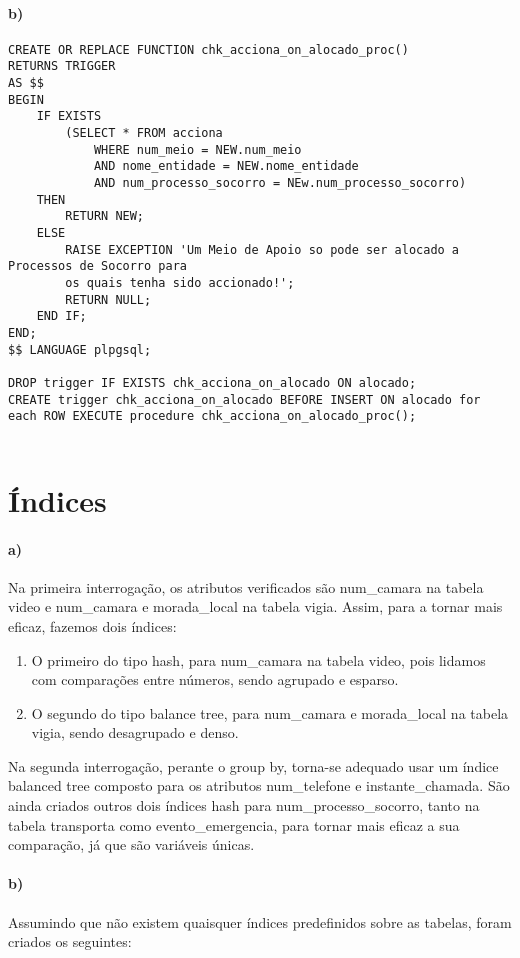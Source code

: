 \documentclass[10pt,a4paper]{article}
\begin{document}
\paragraph{b)}
\begin{verbatim}
CREATE OR REPLACE FUNCTION chk_acciona_on_alocado_proc()
RETURNS TRIGGER
AS $$
BEGIN
    IF EXISTS
        (SELECT * FROM acciona
            WHERE num_meio = NEW.num_meio
            AND nome_entidade = NEW.nome_entidade
            AND num_processo_socorro = NEw.num_processo_socorro)
    THEN
        RETURN NEW;
    ELSE
        RAISE EXCEPTION 'Um Meio de Apoio so pode ser alocado a Processos de Socorro para
        os quais tenha sido accionado!';
        RETURN NULL;
    END IF;
END;
$$ LANGUAGE plpgsql;

DROP trigger IF EXISTS chk_acciona_on_alocado ON alocado;
CREATE trigger chk_acciona_on_alocado BEFORE INSERT ON alocado for each ROW EXECUTE procedure chk_acciona_on_alocado_proc();
    
\end{verbatim}
\section{Índices}

\paragraph{a)}
Na primeira interrogação, os atributos verificados são num\_camara na tabela video e num\_camara e morada\_local na tabela vigia.
Assim, para a tornar mais eficaz, fazemos dois índices:

\begin{enumerate}
    \item O primeiro do tipo hash, para num\_camara na tabela video, pois lidamos com comparações entre números, sendo agrupado
    e esparso.
    \item O segundo do tipo balance tree, para num\_camara e morada\_local na tabela vigia, sendo desagrupado e denso.
\end{enumerate}

Na segunda interrogação, perante o group by, torna-se adequado usar um índice balanced tree composto para os atributos
num\_telefone e instante\_chamada.
São ainda criados outros dois índices hash para num\_processo\_socorro, tanto na tabela transporta como evento\_emergencia,
para tornar mais eficaz a sua comparação, já que são variáveis únicas.

\paragraph{b)}
Assumindo que não existem quaisquer índices predefinidos sobre as tabelas, foram criados os seguintes:
\end{document}
